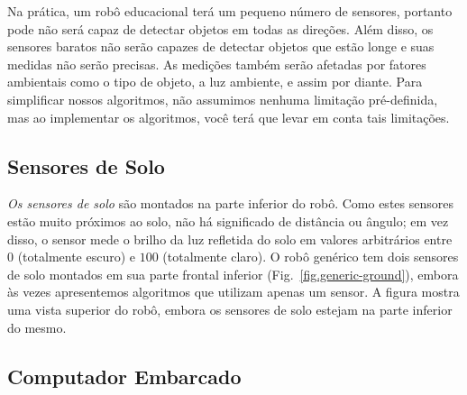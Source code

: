 
Na prática, um robô educacional terá um pequeno número de sensores, portanto pode não será capaz de detectar objetos em todas as direções. Além disso, os sensores baratos não serão capazes de detectar objetos que estão longe e suas medidas não serão precisas. As medições também serão afetadas por fatores ambientais como o tipo de objeto, a luz ambiente, e assim por diante. Para simplificar nossos algoritmos, não assumimos nenhuma limitação pré-definida, mas ao implementar os algoritmos, você terá que levar em conta tais limitações.

\subsection{Sensores de Solo}

\emph{Os sensores de solo} são montados na parte inferior do robô. Como estes sensores estão muito próximos ao solo, não há significado de distância ou ângulo; em vez disso, o sensor mede o brilho da luz refletida do solo em valores arbitrários entre $0$ (totalmente escuro) e $100$ (totalmente claro). O robô genérico tem dois sensores de solo montados em sua parte frontal inferior (Fig.~\ref{fig.generic-ground}), embora às vezes apresentemos algoritmos que utilizam apenas um sensor. A figura mostra uma vista superior do robô, embora os sensores de solo estejam na parte inferior do mesmo.

\subsection{Computador Embarcado}\label{s.embedded}

